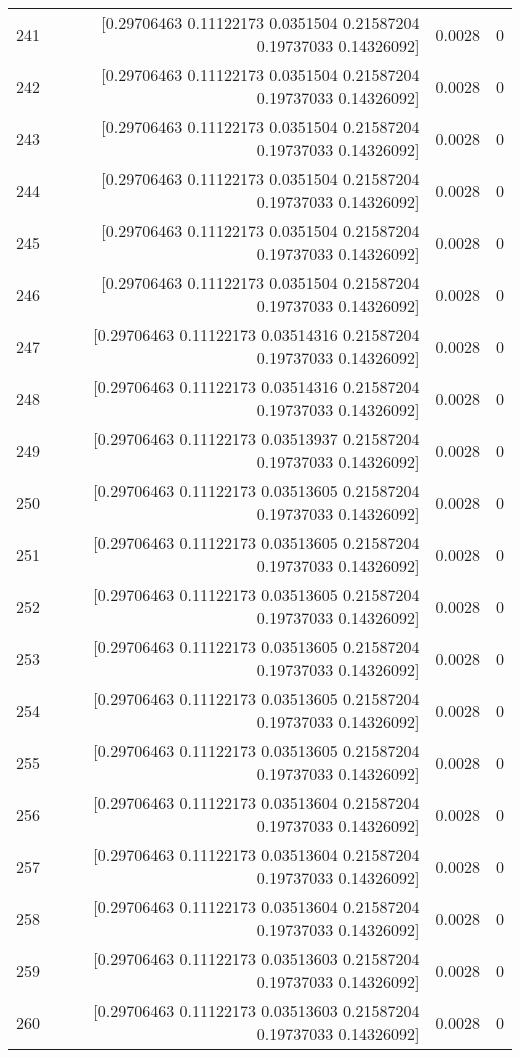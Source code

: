 \begin{longtable}{lrrr}
241 & [0.29706463 0.11122173 0.0351504  0.21587204 0.19737033 0.14326092] & 0.0028 & 0 \\
242 & [0.29706463 0.11122173 0.0351504  0.21587204 0.19737033 0.14326092] & 0.0028 & 0 \\
243 & [0.29706463 0.11122173 0.0351504  0.21587204 0.19737033 0.14326092] & 0.0028 & 0 \\
244 & [0.29706463 0.11122173 0.0351504  0.21587204 0.19737033 0.14326092] & 0.0028 & 0 \\
245 & [0.29706463 0.11122173 0.0351504  0.21587204 0.19737033 0.14326092] & 0.0028 & 0 \\
246 & [0.29706463 0.11122173 0.0351504  0.21587204 0.19737033 0.14326092] & 0.0028 & 0 \\
247 & [0.29706463 0.11122173 0.03514316 0.21587204 0.19737033 0.14326092] & 0.0028 & 0 \\
248 & [0.29706463 0.11122173 0.03514316 0.21587204 0.19737033 0.14326092] & 0.0028 & 0 \\
249 & [0.29706463 0.11122173 0.03513937 0.21587204 0.19737033 0.14326092] & 0.0028 & 0 \\
250 & [0.29706463 0.11122173 0.03513605 0.21587204 0.19737033 0.14326092] & 0.0028 & 0 \\
251 & [0.29706463 0.11122173 0.03513605 0.21587204 0.19737033 0.14326092] & 0.0028 & 0 \\
252 & [0.29706463 0.11122173 0.03513605 0.21587204 0.19737033 0.14326092] & 0.0028 & 0 \\
253 & [0.29706463 0.11122173 0.03513605 0.21587204 0.19737033 0.14326092] & 0.0028 & 0 \\
254 & [0.29706463 0.11122173 0.03513605 0.21587204 0.19737033 0.14326092] & 0.0028 & 0 \\
255 & [0.29706463 0.11122173 0.03513605 0.21587204 0.19737033 0.14326092] & 0.0028 & 0 \\
256 & [0.29706463 0.11122173 0.03513604 0.21587204 0.19737033 0.14326092] & 0.0028 & 0 \\
257 & [0.29706463 0.11122173 0.03513604 0.21587204 0.19737033 0.14326092] & 0.0028 & 0 \\
258 & [0.29706463 0.11122173 0.03513604 0.21587204 0.19737033 0.14326092] & 0.0028 & 0 \\
259 & [0.29706463 0.11122173 0.03513603 0.21587204 0.19737033 0.14326092] & 0.0028 & 0 \\
260 & [0.29706463 0.11122173 0.03513603 0.21587204 0.19737033 0.14326092] & 0.0028 & 0 \\

\end{longtable}
